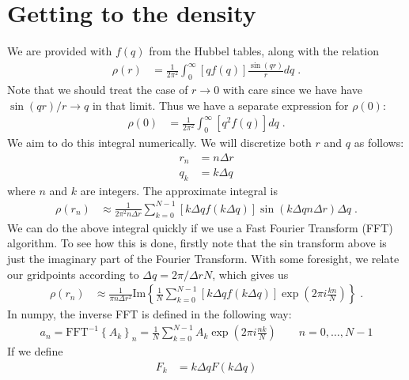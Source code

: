 \documentclass[11pt]{article}
\begin{document}
\section{Getting to the density}

We are provided with $f(q)$ from the Hubbel tables, along with the relation 
\begin{align}
  \rho(r) &= \frac{1}{2 \pi^2} \int_0^\infty     [q f(q)]  \frac{\sin(qr)}{r}dq  \;. \label{eqn:trans}
\end{align}
Note that we should treat the case of $r\rightarrow 0$ with care since we have have $\sin(qr)/r \rightarrow q$ in that limit.  Thus we have
a separate expression for $\rho(0)$:
\begin{align}
  \rho(0) &= \frac{1}{2 \pi^2} \int_0^\infty     [q^2 f(q)]  dq  \;. \label{eqn:trans0}
\end{align}
We aim to do this integral numerically.  We will discretize both $r$ and $q$ as follows:
\begin{align}
r_n &= n\Delta r \\
q_k &= k \Delta q
\end{align}
where $n$ and $k$ are integers.  The approximate integral is
\begin{align}
\rho(r_n) &\approx  \frac{1}{2 \pi^2 n\Delta r }\sum_{k=0}^{N-1}
[k \Delta q f(k \Delta q)]  \sin(k \Delta q n\Delta r) \Delta q \; .
\end{align}
We can do the above integral quickly if we use a Fast Fourier Transform (FFT) algorithm.  To see how this is done,
firstly note that the sin transform above is just the imaginary part of the Fourier Transform.  With some foresight, we
relate our gridpoints according to $\Delta q  = 2\pi / \Delta r N$, which gives us
\begin{align}
\rho(r_n) &\approx  \frac{1}{ \pi n\Delta r^2 }\text{Im}\left\{ \frac{1}{N}\sum_{k=0}^{N-1}
[k \Delta q f(k \Delta q)]  \exp\left(2\pi i \frac{ k  n}{N}\right) \right\} \; .
\end{align}
In numpy, the inverse FFT is defined in the following way:
\begin{align}\label{eqn:idft}
a_n = \text{FFT}^{-1}\left\{ A_k \right\}_n = \frac{1}{N}\sum_{k=0}^{N-1}A_k\exp\left(2\pi i \frac{nk}{N}\right)
\qquad n = 0,\ldots,N-1
\end{align}
If we define
\begin{align}
F_k &= k \Delta q F(k \Delta q) 
\end{align}
\end{document}
